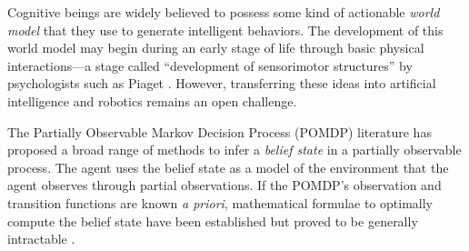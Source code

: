 \documentclass[runningheads]{llncs}
\begin{document}
Cognitive beings are widely believed to possess some kind of actionable \textit{world model} that they use to generate intelligent behaviors.
The development of this world model may begin during an early stage of life through basic physical inter\-actions---a stage called ``development of sensorimotor structures'' by psychologists such as Piaget \cite[p. 104]{dolle_pour_2005}. 
However, transferring these ideas into artificial intelligence and robotics remains an open challenge.



The Partially Observable Markov Decision Process (POMDP) literature has proposed a broad range of methods to infer a \textit{belief state} in a partially observable process.
The agent uses the belief state as a model of the environment that the agent observes through partial observations.  
If 
the POMDP's observation and transition functions are known \textit{a priori}, 
mathematical formulae to optimally compute the belief state have been established but proved to be generally intractable %
\cite{kaelbling1998planning}. 
\end{document}
